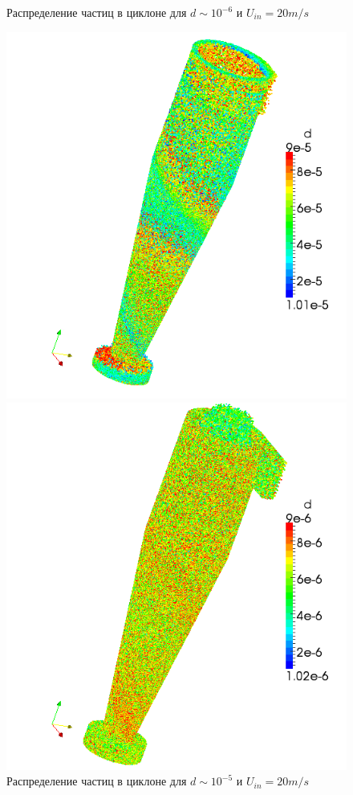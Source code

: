 \begin{figure}[h]
\begin{minipage}{0.475\linewidth}
		\caption{Распределение частиц в циклоне для $d \sim 10^{-6}$ и $U_{in} = 20m/s$}
		\label{fig:parcelsCyclone2}
	\end{minipage}
	\begin{minipage}{0.475\linewidth}
		\includegraphics[scale=0.4]{parcelsCyclone3}
		\caption{Распределение частиц в циклоне для $d \sim 10^{-5}$ и $U_{in} = 20m/s$}
		\label{fig:parcelsCyclone3}
	\end{minipage}
	\hspace{0.5em}
	\begin{minipage}{0.475\linewidth}
		\includegraphics[scale=0.4]{parcelsCyclone4}

\end{minipage}
\end{figure}
